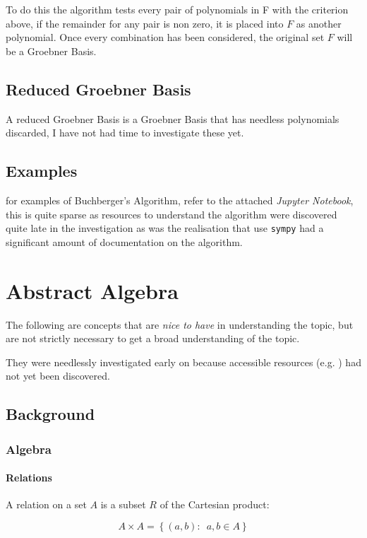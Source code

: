 \documentclass[a4paper,11pt,twoside]{article}
\begin{document}
To do this the algorithm tests every pair of polynomials in F with
the criterion above, if the remainder for any pair is non zero,
it is placed into \(F\) as another polynomial. 
Once every combination has been considered, the original set
\(F\) will be a Groebner Basis.

\subsection{Reduced Groebner Basis}
\label{sec:org8d408a4}
A reduced Groebner Basis is a Groebner Basis that has needless
polynomials discarded, I have not had time to investigate these
yet.

\subsection{Examples}
\label{sec:orge2124cf}
for examples of Buchberger's Algorithm, refer to the attached
\emph{Jupyter Notebook}, this is quite sparse as resources to understand
the algorithm were discovered quite late in the investigation as
was the realisation that use \texttt{sympy} had a significant amount of
documentation on the algorithm.
\section{Abstract Algebra}
\label{sec:org3828c0d}
The following are concepts that are \emph{nice to have} in understanding
the topic, but are not strictly necessary to get a broad
understanding of the topic.

They were needlessly investigated early on because accessible
resources
(e.g. \cite{coxIdealsVarietiesAlgorithms1997,andreasschulzIntegerProgrammingCombinatorial,sympydevelopmentteamSympyPolysGroebnertools})
had not yet been discovered.
\subsection{Background}
\label{sec:orga0d603b}
\subsubsection{Algebra}
\label{sec:orgc7a5871}
\paragraph{Relations}
\label{sec:org743ec47}
A relation on a set \(A\) is a subset \(R\) of the Cartesian
product:

\[
     A\times A=\left\{ \left(a,b\right):\enspace a,b\in A\right\}
     \]
\end{document}
